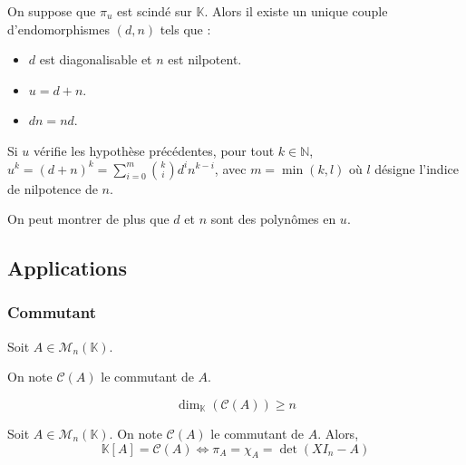 
	\begin{theorem}
		On suppose que $\pi_u$ est scindé sur $\mathbb{K}$. Alors il existe un unique couple d'endomorphismes $(d, n)$ tels que :
		\begin{itemize}
			\item $d$ est diagonalisable et $n$ est nilpotent.
			\item $u = d + n$.
			\item $d n = n d$.
		\end{itemize}
	\end{theorem}

	\begin{corollary}
		Si $u$ vérifie les hypothèse précédentes, pour tout $k \in \mathbb{N}$, $u^k = (d + n)^k = \sum_{i=0}^m \binom{k}{i} d^i n^{k-i}$, avec $m = \min(k, l)$ où $l$ désigne l'indice de nilpotence de $n$.
	\end{corollary}

	\begin{remark}
		On peut montrer de plus que $d$ et $n$ sont des polynômes en $u$.
	\end{remark}

	\subsection{Applications}

	\subsubsection{Commutant}


	Soit $A \in \mathcal{M}_n(\mathbb{K})$.

	\begin{notation}
		On note $\mathcal{C}(A)$ le commutant de $A$.
	\end{notation}

	\begin{lemma}
		\[ \dim_{\mathbb{K}}(\mathcal{C}(A)) \geq n \]
	\end{lemma}

	\begin{application}
		Soit $A \in \mathcal{M}_n(\mathbb{K})$. On note $\mathcal{C}(A)$ le commutant de $A$. Alors,
		\[ \mathbb{K}[A] = \mathcal{C}(A) \iff \pi_A = \chi_A = \det(XI_n - A) \]
	\end{application}

